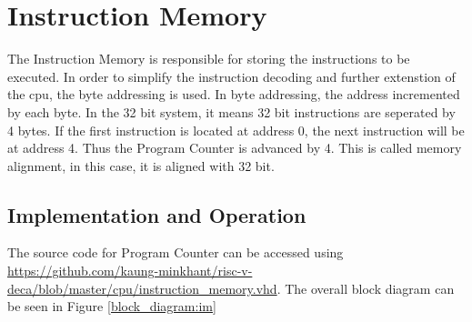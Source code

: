\section{Instruction Memory}
The Instruction Memory is responsible for storing the instructions to be executed.
In order to simplify the instruction decoding and further extenstion of the cpu, the byte addressing is used.
In byte addressing, the address incremented by each byte.
In the 32 bit system, it means 32 bit instructions are seperated by 4 bytes.
If the first instruction is located at address 0, the next instruction will be at address 4.
Thus the Program Counter is advanced by 4. This is called memory alignment, in this case, it is aligned with 32 bit.

\subsection{Implementation and Operation}
The source code for Program Counter
can be accessed using \url{https://github.com/kaung-minkhant/risc-v-deca/blob/master/cpu/instruction_memory.vhd}.
The overall block diagram can be seen in Figure \ref{block_diagram:im}

\begin{table}[!h]
    \centering
    \caption{Input/Output of Instruction Memory}
    \label{table:io_im}
\end{table}

